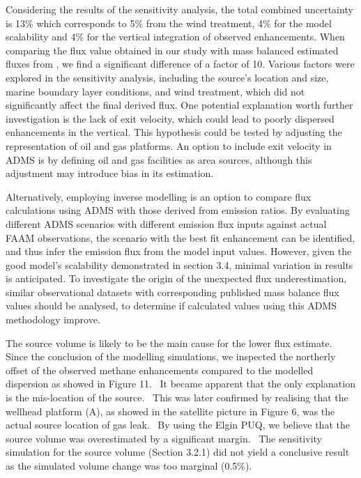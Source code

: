 \documentclass[12pt]{article}
\begin{document}
Considering the results of the sensitivity analysis, the total combined uncertainty is 13\% which corresponds to 5\% from the wind treatment, 4\% for the model scalability and 4\% for the vertical integration of observed enhancements. 
When comparing the flux value obtained in our study with mass balanced estimated fluxes from \cite{Lee2018FlowRelease}, we find a significant difference of a factor of 10. Various factors were explored in the sensitivity analysis, including the source's location and size, marine boundary layer conditions, and wind treatment, which did not significantly affect the final derived flux. 
One potential explanation worth further investigation is the lack of exit velocity, which could lead to poorly dispersed enhancements in the vertical. This hypothesis could be tested by adjusting the representation of oil and gas platforms. An option to include exit velocity in ADMS is by defining oil and gas facilities as area sources, although this adjustment may introduce bias in its estimation.

Alternatively, employing inverse modelling is an option to compare flux calculations using ADMS with those derived from emission ratios. By evaluating different ADMS scenarios with different emission flux inputs against actual FAAM observations, the scenario with the best fit enhancement can be identified, and thus infer the emission flux from the model input values. However, given the good model's scalability demonstrated in section 3.4, minimal variation in results is anticipated.
To investigate the origin of the unexpected flux underestimation, similar observational datasets with corresponding published mass balance flux values should be analysed, to determine if calculated values using this ADMS methodology improve. 

The source volume is likely to be the main cause for the lower flux estimate.  Since the conclusion of the modelling simulations, we inspected the northerly offset of the observed methane enhancements compared to the modelled dispersion as showed in Figure 11.  It became apparent that the only explanation is the mis-location of the source.  This was later confirmed by realising that the wellhead platform (A), as showed in the satellite picture in Figure 6, was the actual source location of gas leak.  By using the Elgin PUQ, we believe that the source volume was overestimated by a significant margin.  The sensitivity simulation for the source volume (Section 3.2.1) did not yield a conclusive result as the simulated volume change was too marginal (0.5\%).  
\end{document}
